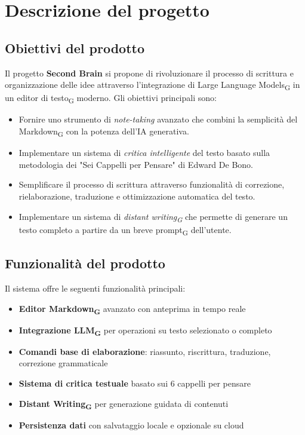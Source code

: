 \documentclass[11pt,a4paper]{article}
\newcommand{\gls}[1]{#1\textsubscript{G}}
\begin{document}
\newpage

\section{Descrizione del progetto}
\subsection{Obiettivi del prodotto}
Il progetto \textbf{Second Brain} si propone di rivoluzionare il processo di scrittura e organizzazione delle idee attraverso l'integrazione di Large Language Models\textsubscript{G} in un \gls{editor di testo} moderno. Gli obiettivi principali sono:

\begin{itemize}
    \item Fornire uno strumento di \textit{note-taking} avanzato che combini la semplicità del \gls{Markdown} con la potenza dell'IA generativa.
    \item Implementare un sistema di \textit{critica intelligente} del testo basato sulla metodologia dei "Sei Cappelli per Pensare" di Edward De Bono.
    \item Semplificare il processo di scrittura attraverso funzionalità di correzione, rielaborazione, traduzione e ottimizzazione automatica del testo.
    \item Implementare un sistema di \textit{\gls{distant writing}} che permette di generare un testo completo a partire da un breve \gls{prompt} dell'utente.
\end{itemize}


\subsection{Funzionalità del prodotto}
Il sistema offre le seguenti funzionalità principali:

\begin{itemize}
    \item \textbf{Editor \gls{Markdown}} avanzato con anteprima in tempo reale
    \item \textbf{Integrazione LLM\textsubscript{G}} per operazioni su testo selezionato o completo
    \item \textbf{Comandi base di elaborazione}: riassunto, riscrittura, traduzione, correzione grammaticale
    \item \textbf{Sistema di critica testuale} basato sui 6 cappelli per pensare
    \item \textbf{\gls{Distant Writing}} per generazione guidata di contenuti
    \item \textbf{Persistenza dati} con salvataggio locale e opzionale su cloud
\end{itemize}
\end{document}
